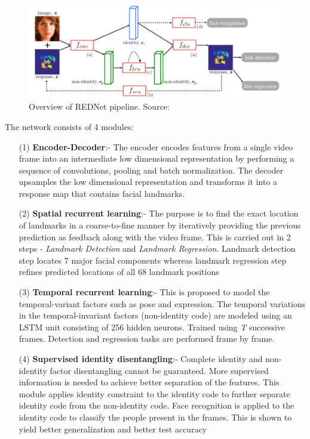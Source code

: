 \documentclass{llncs}
\begin{document}
\begin{figure}
\centering
\includegraphics[scale=0.5]{Media/rednet_architecture}
\caption{Overview of REDNet pipeline. Source:\cite{rednet}}
\label{rednet_architecture}
\end{figure}

The network consists of 4 modules:
\begin{itemize}
\item[(1)] \textbf{Encoder-Decoder}:-
The encoder encodes features from a single video frame into an intermediate low dimensional representation by performing a sequence of convolutions, pooling and batch normalization. The decoder upsamples the low dimensional representation and transforms it into a response map that contains facial landmarks.
\item[(2)] \textbf{Spatial recurrent learning}:-
The purpose is to find the exact location of landmarks in a coarse-to-fine manner by iteratively providing the previous prediction as feedback along with the video frame. This is carried out in 2 steps - \textit{Landmark Detection} and \textit{Landmark Regression}. Landmark detection step locates 7 major facial components whereas landmark regression step refines predicted locations of all 68 landmark positions
\item[(3)] \textbf{Temporal recurrent learning}:-
This is proposed to model the temporal-variant factors such as pose and expression. The temporal variations in the temporal-invariant factors (non-identity code) are modeled using an LSTM unit consisting of 256 hidden neurons.
Trained using \textit{T} successive frames. Detection and regression tasks are performed frame by frame. 
\item[(4)] \textbf{Supervised identity disentangling}:-
Complete identity and non-identity factor disentangling cannot be guaranteed. More supervised information is needed to achieve better separation of the features. This module applies identity constraint to the identity code to further separate identity code from the non-identity code. Face recognition is applied to the identity code to classify the people present in the frames. This is shown to yield better generalization and better test accuracy\\
\end{itemize}
 
\end{document}

